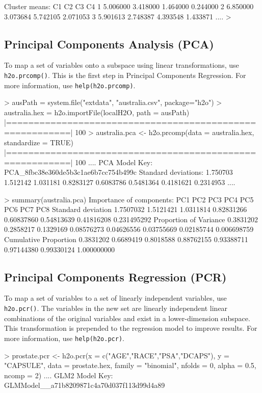 \documentclass[11pt]{article}
\begin{document}
{\begin{spverbatim}
Cluster means:
        C1       C2       C3       C4
1 5.006000 3.418000 1.464000 0.244000
2 6.850000 3.073684 5.742105 2.071053
3 5.901613 2.748387 4.393548 1.433871
  ....
> \end{spverbatim}

\subsection{Principal Components Analysis (PCA)}

To map a set of variables onto a subspace using linear transformations, use {\texttt{h2o.prcomp()}}. This is the first step in Principal Components Regression. For more information, use {\texttt{help(h2o.prcomp)}}.
\begin{spverbatim}
> ausPath = system.file("extdata", "australia.csv", package="h2o")
> australia.hex = h2o.importFile(localH2O, path = ausPath)
  |=========================================================| 100%
> australia.pca <- h2o.prcomp(data = australia.hex, standardize = TRUE)
  |=========================================================| 100%
      ....
PCA Model Key: PCA_8fbc38e360de5b3c1ae6b7cc754b499c
Standard deviations:
 1.750703 1.512142 1.031181 0.8283127 0.6083786 0.5481364 0.4181621 0.2314953
      ....

> summary(australia.pca)
Importance of components:
                             PC1       PC2       PC3        PC4        PC5        PC6        PC7         PC8
Standard deviation     1.7507032 1.5121421 1.0311814 0.82831266 0.60837860 0.54813639 0.41816208 0.231495292
Proportion of Variance 0.3831202 0.2858217 0.1329169 0.08576273 0.04626556 0.03755669 0.02185744 0.006698759
Cumulative Proportion  0.3831202 0.6689419 0.8018588 0.88762155 0.93388711 0.97144380 0.99330124 1.000000000
\end{spverbatim}

\subsection{Principal Components Regression (PCR)}

To map a set of variables to a set of linearly independent variables, use {\texttt{h2o.pcr()}}. The variables in the new set are linearly independent linear combinations of the original variables and exist in a lower-dimension subspace. This transformation is prepended to the regression model to improve results. For more information, use {\texttt{help(h2o.pcr)}}.
\begin{spverbatim}
> prostate.pcr <- h2o.pcr(x = c("AGE","RACE","PSA","DCAPS"), y = "CAPSULE", data = prostate.hex, family = "binomial", 
  nfolds = 0, alpha = 0.5, ncomp = 2)
      ....
GLM2 Model Key: GLMModel__a71b8209871c4a70d037f113d99d4a89


\end{spverbatim}}
\end{document}
